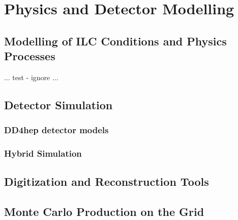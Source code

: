 \chapter{Physics and Detector Modelling}

\section{Modelling of ILC Conditions and Physics Processes}

... test - ignore ...
\section{Detector Simulation}

\subsection{DD4hep detector models}
\subsection{Hybrid Simulation}

\section{Digitization and Reconstruction Tools}

\section{Monte Carlo Production on the Grid}